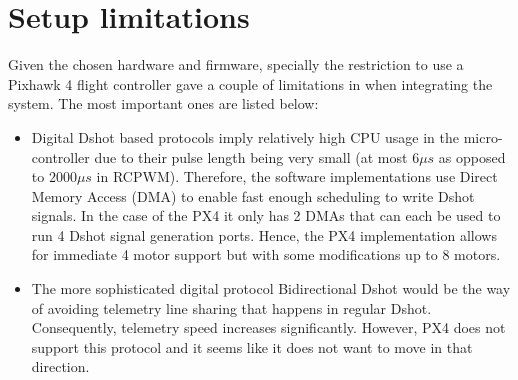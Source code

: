\section{Setup limitations}
Given the chosen hardware and firmware, specially the restriction to use a Pixhawk 4 flight controller gave a couple of limitations in when integrating the system. The most important ones are listed below:
\begin{itemize}
	\item Digital Dshot based protocols imply relatively high CPU usage in the micro-controller due to their pulse length being very small (at most $6\mu s$ as opposed to $2000\mu s$ in RCPWM). Therefore, the software implementations use Direct Memory Access (DMA) to enable fast enough scheduling to write Dshot signals. In the case of the PX4 it only has 2 DMAs that can each be used to run 4 Dshot signal generation ports. Hence, the PX4 implementation allows for immediate 4 motor support but with some modifications up to 8 motors.

	\item The more sophisticated digital protocol Bidirectional Dshot would be the way of avoiding telemetry line sharing that happens in regular Dshot. Consequently, telemetry speed increases significantly. However, PX4 does not support this protocol and it seems like it does not want to move in that direction.



\end{itemize}

